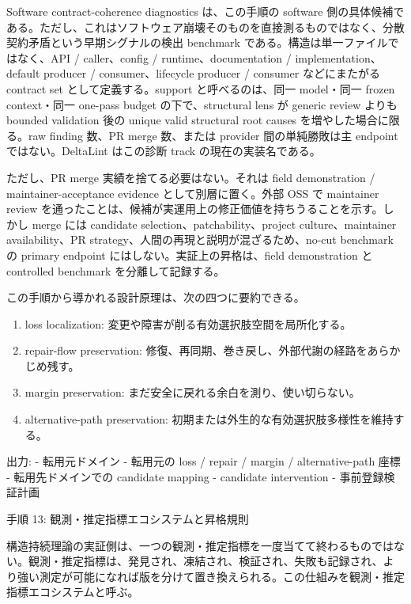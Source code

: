 \documentclass[12pt,a4paper]{article}
\begin{document}
Software contract-coherence diagnostics は、この手順の software 側の具体候補である。ただし、これはソフトウェア崩壊そのものを直接測るものではなく、分散契約矛盾という早期シグナルの検出 benchmark である。構造は単一ファイルではなく、API / caller、config / runtime、documentation / implementation、default producer / consumer、lifecycle producer / consumer などにまたがる contract set として定義する。support と呼べるのは、同一 model・同一 frozen context・同一 one-pass budget の下で、structural lens が generic review よりも bounded validation 後の unique valid structural root causes を増やした場合に限る。raw finding 数、PR merge 数、または provider 間の単純勝敗は主 endpoint ではない。DeltaLint はこの診断 track の現在の実装名である。

ただし、PR merge 実績を捨てる必要はない。それは field demonstration / maintainer-acceptance evidence として別層に置く。外部 OSS で maintainer review を通ったことは、候補が実運用上の修正価値を持ちうることを示す。しかし merge には candidate selection、patchability、project culture、maintainer availability、PR strategy、人間の再現と説明が混ざるため、no-cut benchmark の primary endpoint にはしない。実証上の昇格は、field demonstration と controlled benchmark を分離して記録する。

この手順から導かれる設計原理は、次の四つに要約できる。

\begin{enumerate}
\def\labelenumi{\arabic{enumi}.}
\tightlist
\item
  loss localization: 変更や障害が削る有効選択肢空間を局所化する。
\item
  repair-flow preservation: 修復、再同期、巻き戻し、外部代謝の経路をあらかじめ残す。
\item
  margin preservation: まだ安全に戻れる余白を測り、使い切らない。
\item
  alternative-path preservation: 初期または外生的な有効選択肢多様性を維持する。
\end{enumerate}

出力: - 転用元ドメイン - 転用元の loss / repair / margin / alternative-path 座標 - 転用先ドメインでの candidate mapping - candidate intervention - 事前登録検証計画

手順 13: 観測・推定指標エコシステムと昇格規則

構造持続理論の実証側は、一つの観測・推定指標を一度当てて終わるものではない。観測・推定指標は、発見され、凍結され、検証され、失敗も記録され、より強い測定が可能になれば版を分けて置き換えられる。この仕組みを観測・推定指標エコシステムと呼ぶ。
\end{document}
